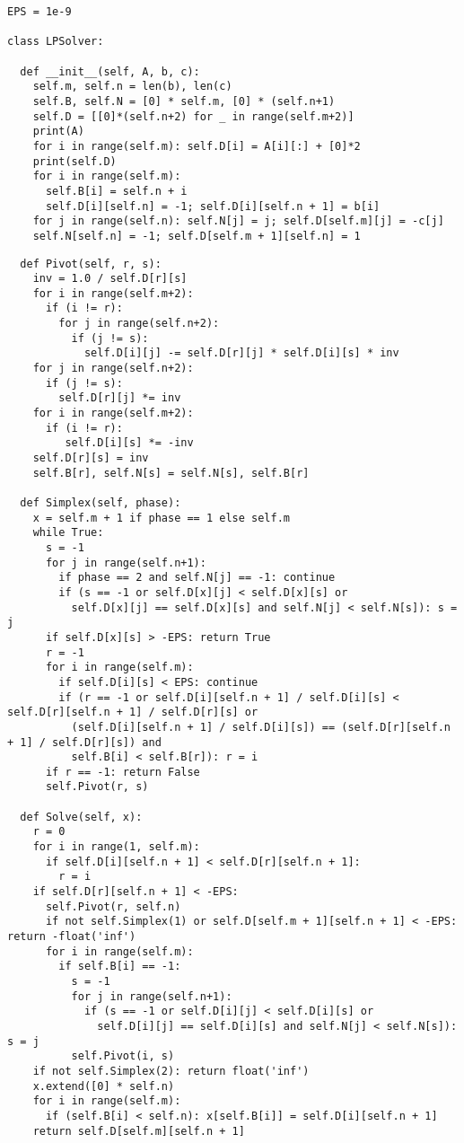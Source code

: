 \documentclass[letterpaper]{article}
\begin{document}
\begin{lstlisting}
EPS = 1e-9

class LPSolver:

  def __init__(self, A, b, c):
    self.m, self.n = len(b), len(c)
    self.B, self.N = [0] * self.m, [0] * (self.n+1)
    self.D = [[0]*(self.n+2) for _ in range(self.m+2)]
    print(A)
    for i in range(self.m): self.D[i] = A[i][:] + [0]*2
    print(self.D)
    for i in range(self.m):
      self.B[i] = self.n + i
      self.D[i][self.n] = -1; self.D[i][self.n + 1] = b[i]
    for j in range(self.n): self.N[j] = j; self.D[self.m][j] = -c[j]
    self.N[self.n] = -1; self.D[self.m + 1][self.n] = 1
\end{lstlisting}
\clearpage
\begin{lstlisting}
  def Pivot(self, r, s):
    inv = 1.0 / self.D[r][s]
    for i in range(self.m+2):
      if (i != r):
        for j in range(self.n+2):
          if (j != s):
            self.D[i][j] -= self.D[r][j] * self.D[i][s] * inv
    for j in range(self.n+2):
      if (j != s):
        self.D[r][j] *= inv
    for i in range(self.m+2):
      if (i != r):
         self.D[i][s] *= -inv
    self.D[r][s] = inv
    self.B[r], self.N[s] = self.N[s], self.B[r]

  def Simplex(self, phase):
    x = self.m + 1 if phase == 1 else self.m
    while True:
      s = -1
      for j in range(self.n+1):
        if phase == 2 and self.N[j] == -1: continue
        if (s == -1 or self.D[x][j] < self.D[x][s] or
          self.D[x][j] == self.D[x][s] and self.N[j] < self.N[s]): s = j
      if self.D[x][s] > -EPS: return True
      r = -1
      for i in range(self.m):
        if self.D[i][s] < EPS: continue
        if (r == -1 or self.D[i][self.n + 1] / self.D[i][s] < self.D[r][self.n + 1] / self.D[r][s] or
          (self.D[i][self.n + 1] / self.D[i][s]) == (self.D[r][self.n + 1] / self.D[r][s]) and
          self.B[i] < self.B[r]): r = i
      if r == -1: return False
      self.Pivot(r, s)

  def Solve(self, x):
    r = 0
    for i in range(1, self.m):
      if self.D[i][self.n + 1] < self.D[r][self.n + 1]:
        r = i
    if self.D[r][self.n + 1] < -EPS:
      self.Pivot(r, self.n)
      if not self.Simplex(1) or self.D[self.m + 1][self.n + 1] < -EPS: return -float('inf')
      for i in range(self.m):
        if self.B[i] == -1:
          s = -1
          for j in range(self.n+1):
            if (s == -1 or self.D[i][j] < self.D[i][s] or
              self.D[i][j] == self.D[i][s] and self.N[j] < self.N[s]): s = j
          self.Pivot(i, s)
    if not self.Simplex(2): return float('inf')
    x.extend([0] * self.n)
    for i in range(self.m):
      if (self.B[i] < self.n): x[self.B[i]] = self.D[i][self.n + 1]
    return self.D[self.m][self.n + 1]
\end{lstlisting}
\end{document}
